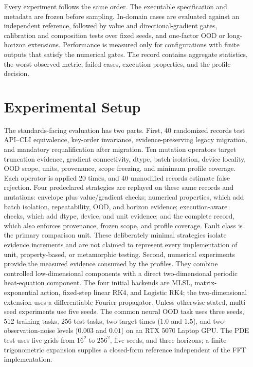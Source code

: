 \documentclass[preprint,12pt,authoryear]{elsarticle}
\newcommand{\mlsl}{\textnormal{MLSL}}
\begin{document}
Every experiment follows the same order. The executable specification and metadata are frozen before sampling. In-domain cases are evaluated against an independent reference, followed by value and directional-gradient gates, calibration and composition tests over fixed seeds, and one-factor OOD or long-horizon extensions. Performance is measured only for configurations with finite outputs that satisfy the numerical gates. The record contains aggregate statistics, the worst observed metric, failed cases, execution properties, and the profile decision.

\section{Experimental Setup}
The standards-facing evaluation has two parts. First, 40 randomized records test API--CLI equivalence, key-order invariance, evidence-preserving legacy migration, and mandatory requalification after migration. Ten mutation operators target truncation evidence, gradient connectivity, dtype, batch isolation, device locality, OOD scope, units, provenance, scope freezing, and minimum profile coverage. Each operator is applied 20 times, and 40 unmodified records estimate false rejection. Four predeclared strategies are replayed on these same records and mutations: envelope plus value/gradient checks; numerical properties, which add batch isolation, repeatability, OOD, and horizon evidence; execution-aware checks, which add dtype, device, and unit evidence; and the complete record, which also enforces provenance, frozen scope, and profile coverage. Fault class is the primary comparison unit. These deliberately minimal strategies isolate evidence increments and are not claimed to represent every implementation of unit, property-based, or metamorphic testing. Second, numerical experiments provide the measured evidence consumed by the profiles. They combine controlled low-dimensional components with a direct two-dimensional periodic heat-equation component. The four initial backends are \mlsl{}, matrix-exponential action, fixed-step linear RK4, and Logistic RK4; the two-dimensional extension uses a differentiable Fourier propagator. Unless otherwise stated, multi-seed experiments use five seeds. The common neural OOD task uses three seeds, 512 training tasks, 256 test tasks, two target times ($1.0$ and $1.5$), and two observation-noise levels ($0.003$ and $0.01$) on an RTX 5070 Laptop GPU. The PDE test uses five grids from $16^2$ to $256^2$, five seeds, and three horizons; a finite trigonometric expansion supplies a closed-form reference independent of the FFT implementation.
\end{document}

